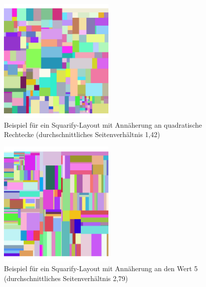 \begin{figure}[h]
    \centering
    \includegraphics[width=0.5\textwidth]{images/oneSquarify.png}
    \caption{Beispiel für ein Squarify-Layout mit Annäherung an quadratische Rechtecke (durchschnittliches Seitenverhältnis 1,42)}
    \label{fig:squarifyRatio1}
\end{figure}

\begin{figure}[h]
    \centering
    \includegraphics[width=0.5\textwidth]{images/fiveSquarify.png}
    \caption{Beispiel für ein Squarify-Layout mit Annäherung an den Wert 5 (durchschnittliches Seitenverhältnis 2,79)}
    \label{fig:squarifyRatio5}
\end{figure}